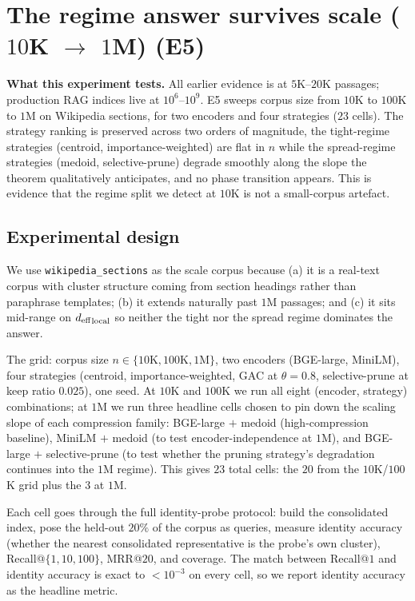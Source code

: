 \section{The regime answer survives scale ($10$K $\to$ $1$M) (E5)}
\label{sec:e5}

\begin{intuition}
\textbf{What this experiment tests.} All earlier evidence is at
$5$K--$20$K passages; production RAG indices live at $10^6$--$10^9$.
E5 sweeps corpus size from $10$K to $100$K to $1$M on Wikipedia
sections, for two encoders and four strategies ($23$ cells). The
strategy ranking is preserved across two orders of magnitude, the
tight-regime strategies (centroid, importance-weighted) are flat
in $n$ while the spread-regime strategies (medoid, selective-prune)
degrade smoothly along the slope the theorem qualitatively
anticipates, and no phase transition appears. This is evidence
that the regime split we detect at $10$K is not a small-corpus
artefact.
\end{intuition}

\subsection{Experimental design}
\label{sec:e5:design}

We use \texttt{wikipedia\_sections} as the scale corpus because (a) it
is a real-text corpus with cluster structure coming from section
headings rather than paraphrase templates; (b) it extends naturally
past $1$M passages; and (c) it sits mid-range on
${d_{\mathrm{eff}}}_{\mathrm{local}}$ so neither the tight nor the spread regime
dominates the answer.

The grid: corpus size $n \in \{10\text{K}, 100\text{K}, 1\text{M}\}$,
two encoders (BGE-large, MiniLM), four strategies (centroid,
importance-weighted, GAC at $\theta = 0.8$, selective-prune at keep
ratio $0.025$), one seed. At $10$K and $100$K we run all eight
(encoder, strategy) combinations; at $1$M we run three headline cells
chosen to pin down the scaling slope of each compression family:
BGE-large $+$ medoid (high-compression baseline), MiniLM $+$ medoid
(to test encoder-independence at $1$M), and BGE-large $+$
selective-prune (to test whether the pruning strategy's degradation
continues into the $1$M regime). This gives $23$ total cells: the $20$
from the $10$K/$100$K grid plus the $3$ at $1$M.

Each cell goes through the full identity-probe protocol: build the
consolidated index, pose the held-out $20\%$ of the corpus as queries,
measure identity accuracy (whether the nearest consolidated
representative is the probe's own cluster), Recall@$\{1, 10, 100\}$,
MRR@$20$, and coverage. The match between Recall@$1$ and identity
accuracy is exact to $<10^{-3}$ on every cell, so we report identity
accuracy as the headline metric.

